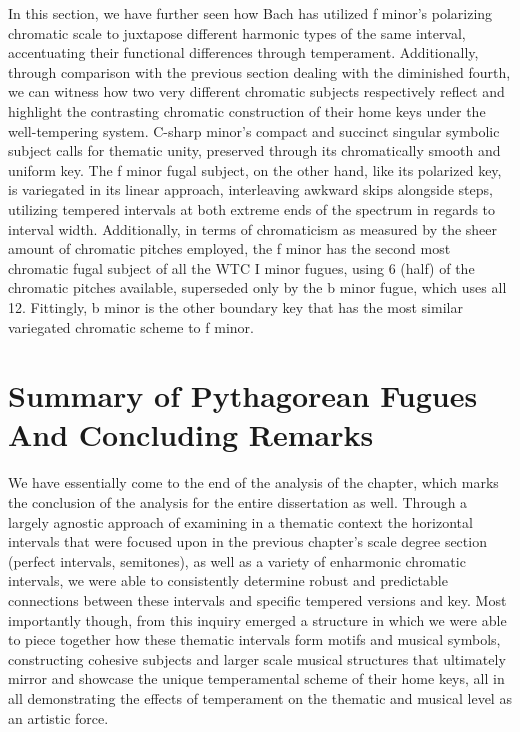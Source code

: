 In this section, we have further seen how Bach has utilized f minor's
polarizing chromatic scale to juxtapose different harmonic types of the
same interval, accentuating their functional differences through
temperament. Additionally, through comparison with the previous section
dealing with the diminished fourth, we can witness how two very
different chromatic subjects respectively reflect and highlight the
contrasting chromatic construction of their home keys under the
well-tempering system. C-sharp minor's compact and succinct singular
symbolic subject calls for thematic unity, preserved through its
chromatically smooth and uniform key. The f minor fugal subject, on the
other hand, like its polarized key, is variegated in its linear
approach, interleaving awkward skips alongside steps, utilizing tempered
intervals at both extreme ends of the spectrum in regards to interval
width. Additionally, in terms of chromaticism as measured by the sheer
amount of chromatic pitches employed, the f minor has the second most
chromatic fugal subject of all the WTC I minor fugues, using 6 (half) of
the chromatic pitches available, superseded only by the b minor fugue,
which uses all 12. Fittingly, b minor is the other boundary key that has
the most similar variegated chromatic scheme to f minor.

    \section{Summary of Pythagorean Fugues And Concluding
Remarks}\label{summary-of-pythagorean-fugues-and-concluding-remarks}

We have essentially come to the end of the analysis of the chapter,
which marks the conclusion of the analysis for the entire dissertation
as well. Through a largely agnostic approach of examining in a thematic
context the horizontal intervals that were focused upon in the previous
chapter's scale degree section (perfect intervals, semitones), as well
as a variety of enharmonic chromatic intervals, we were able to
consistently determine robust and predictable connections between these
intervals and specific tempered versions and key. Most importantly
though, from this inquiry emerged a structure in which we were able to
piece together how these thematic intervals form motifs and musical
symbols, constructing cohesive subjects and larger scale musical
structures that ultimately mirror and showcase the unique temperamental
scheme of their home keys, all in all demonstrating the effects of
temperament on the thematic and musical level as an artistic force.


